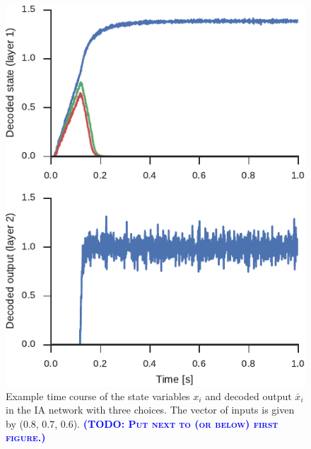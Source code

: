 \documentclass[10pt,letterpaper]{article}
\makeatletter
\newcommand{\todo}[1]{\textbf{\textsc{\textcolor{blue}{(TODO\@: #1)}}}}
\makeatother
\begin{document}
\begin{figure}
    \centering
    \includegraphics{figures/indacc}
    \caption{
        Example time course of the state variables $x_i$ and decoded output $\bar{x}_i$ in the IA network with three choices.
        The vector of inputs is given by (0.8, 0.7, 0.6).
        \todo{Put next to (or below) first figure.}
    }\label{fig:indacc}
\end{figure}
\end{document}
